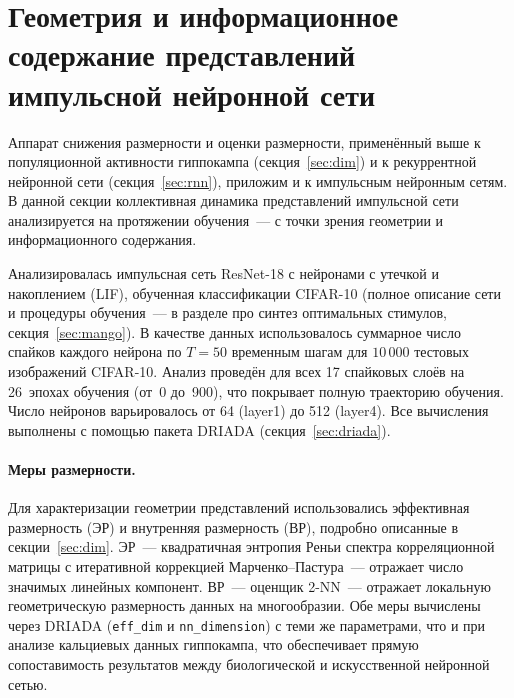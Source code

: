 
\section{Геометрия и информационное содержание представлений импульсной нейронной сети}\label{sec:snn_population}

Аппарат снижения размерности и оценки размерности, применённый выше к популяционной активности гиппокампа (секция~\ref{sec:dim}) и к рекуррентной нейронной сети (секция~\ref{sec:rnn}), приложим и к импульсным нейронным сетям. В данной секции коллективная динамика представлений импульсной сети анализируется на протяжении обучения~--- с точки зрения геометрии и информационного содержания.

Анализировалась импульсная сеть ResNet-18 с нейронами с утечкой и накоплением (LIF), обученная классификации CIFAR-10 (полное описание сети и процедуры обучения~--- в разделе про синтез оптимальных стимулов, секция~\ref{sec:mango}). В качестве данных использовалось суммарное число спайков каждого нейрона по $T=50$ временным шагам для $10\,000$ тестовых изображений CIFAR-10. Анализ проведён для всех 17 спайковых слоёв на 26~эпохах обучения (от~0 до~900), что покрывает полную траекторию обучения. Число нейронов варьировалось от 64 (layer1) до 512 (layer4). Все вычисления выполнены с помощью пакета DRIADA (секция~\ref{sec:driada}).

\paragraph{Меры размерности.}
Для характеризации геометрии представлений использовались эффективная размерность (ЭР) и внутренняя размерность (ВР), подробно описанные в секции~\ref{sec:dim}. ЭР~--- квадратичная энтропия Реньи спектра корреляционной матрицы с итеративной коррекцией Марченко--Пастура~--- отражает число значимых линейных компонент. ВР~--- оценщик 2-NN~--- отражает локальную геометрическую размерность данных на многообразии. Обе меры вычислены через DRIADA (\texttt{eff\_dim} и \texttt{nn\_dimension}) с теми же параметрами, что и при анализе кальциевых данных гиппокампа, что обеспечивает прямую сопоставимость результатов между биологической и искусственной нейронной сетью.

